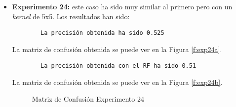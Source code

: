 \begin{itemize}
    \item \textbf{Experimento 24:} este caso ha sido muy similar al primero pero con un \emph{kernel} de 5x5. Los resultados han sido:
    \begin{verbatim}
        La precisión obtenida ha sido 0.525
    \end{verbatim}
    La matriz de confusión obtenida se puede ver en la Figura \ref{f:exp24a}.
    \begin{verbatim}        
        La precisión obtenida con el RF ha sido 0.51
    \end{verbatim}
    La matriz de confusión obtenida se puede ver en la Figura \ref{f:exp24b}.
    \begin{figure}[h]
     \centering
     \caption{Matriz de Confusión Experimento 24}
     \label{f:exp24}
    \end{figure}    
    

\end{itemize}
